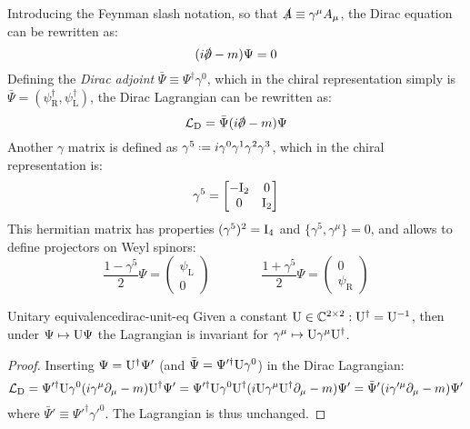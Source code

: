 Introducing the Feynman slash notation, so that $ \slashed{A} \equiv \gamma^\mu A_\mu $, the Dirac equation can be rewritten as:
\begin{equation}
  (i \slashed{\pa} - m) \Psi = 0
\end{equation}
Defining the \textit{Dirac adjoint} $ \bar{\Psi} \equiv \Psi^\dagger \gamma^0 $, which in the chiral representation simply is $ \bar{\Psi} = (\psi_\text{R}^\dagger, \psi_\text{L}^\dagger) $, the Dirac Lagrangian can be rewritten as:
\begin{equation}
  \mathcal{L}_\text{D} = \bar{\Psi} (i \slashed{\pa} - m) \Psi
  \label{eq:dirac-lagrangian}
\end{equation}
Another $ \gamma $ matrix is defined as $ \gamma^5 \defeq i \gamma^0 \gamma^1 \gamma^2 \gamma^3 $, which in the chiral representation is:
\begin{equation*}
  \gamma^5 =
  \begin{bmatrix}
    -\mathrm{I}_2 & 0 \\ 0 & \mathrm{I}_2
  \end{bmatrix}
\end{equation*}
This hermitian matrix has properties $ (\gamma^5)^2 = \mathrm{I}_4 $ and $ \{\gamma^5, \gamma^\mu\} = 0 $, and allows to define projectors on Weyl spinors:
\begin{equation}
  \frac{1 - \gamma^5}{2} \Psi =
  \begin{pmatrix}
    \psi_\text{L} \\ 0
  \end{pmatrix}
  \qquad \qquad
  \frac{1 + \gamma^5}{2} \Psi =
  \begin{pmatrix}
    0 \\ \psi_\text{R}
  \end{pmatrix}
\end{equation}

\begin{proposition}{Unitary equivalence}{dirac-unit-eq}
  Given a constant $ \mathrm{U} \in \mathbb{C}^{2 \times 2} : \mathrm{U}^\dagger = \mathrm{U}^{-1} $, then under $ \Psi \mapsto \mathrm{U} \Psi $ the Lagrangian is invariant for $ \gamma^\mu \mapsto \mathrm{U} \gamma^\mu \mathrm{U}^\dagger $.

  \tcblower

  \begin{proof}
    Inserting $ \Psi = \mathrm{U}^\dagger \Psi' $ (and $ \bar{\Psi} = \Psi'^\dagger \mathrm{U} \gamma^0 $) in the Dirac Lagrangian:
    \begin{equation*}
      \mathcal{L}_\text{D} = \Psi'^\dagger \mathrm{U} \gamma^0 (i \gamma^\mu \partial_\mu - m) \mathrm{U}^\dagger \Psi' = \Psi'^\dagger \mathrm{U} \gamma^0 \mathrm{U}^\dagger (i \mathrm{U} \gamma^\mu \mathrm{U}^\dagger \partial_\mu - m) \Psi' = \bar{\Psi}' (i \gamma'^\mu \partial_\mu - m) \Psi'
    \end{equation*}
    where $ \bar{\Psi}' \equiv \Psi'^\dagger \gamma'^0 $. The Lagrangian is thus unchanged.
  \end{proof}
\end{proposition}

